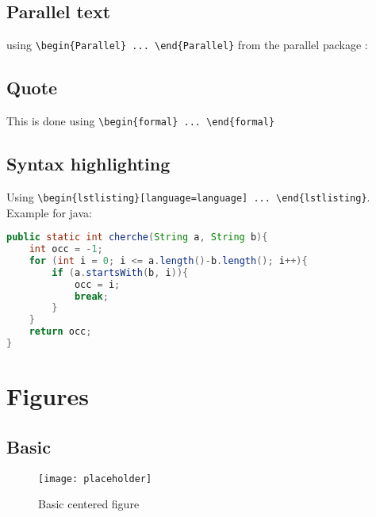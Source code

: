 \documentclass{customSynthesis}
\begin{document}
\subsection*{Parallel text}

using \verb|\begin{Parallel} ... \end{Parallel}| from the parallel package :

\begin{Parallel}[v]{0.48\textwidth}{0.48\textwidth}
\ParallelLText{\noindent
\lipsum[1][1]
}
\ParallelRText{\noindent
\lipsum[1][2]
}
\ParallelPar
\end{Parallel}

\subsection*{Quote}

\begin{formal}
This is done using \verb|\begin{formal} ... \end{formal}|
\end{formal}

\subsection*{Syntax highlighting}

Using \verb|\begin{lstlisting}[language=language] ... \end{lstlisting}|. Example for java:\\

\begin{lstlisting}[language=java]
public static int cherche(String a, String b){
    int occ = -1;
    for (int i = 0; i <= a.length()-b.length(); i++){
        if (a.startsWith(b, i)){
            occ = i;
            break;
        }
    }
    return occ;
}
\end{lstlisting}

\section*{Figures}

\subsection*{Basic}

\begin{figure}[H]
    \centering
    \texttt{[image: placeholder]}
    \caption{Basic centered figure}
\end{figure}
\end{document}
